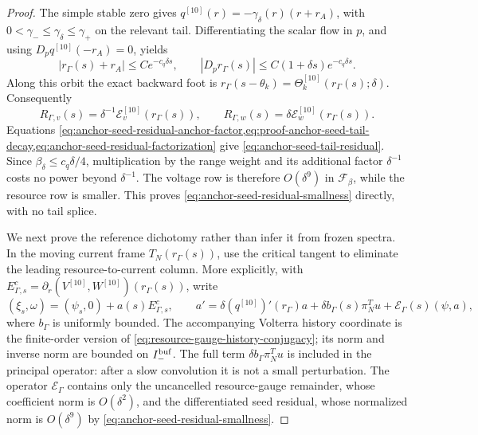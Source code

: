 \begin{proof}
The simple stable zero gives
\(q^{[10]}(r)=-\gamma_\delta(r)(r+r_A)\), with
\(0<\gamma_-\le\gamma_\delta\le\gamma_+\) on the relevant tail.
Differentiating the scalar flow in \(p\), and using
\(D_pq^{[10]}(-r_A)=0\), yields
\begin{equation}
 |r_\Gamma(s)+r_A|\le Ce^{-c_q\delta s},
 \qquad
 |D_pr_\Gamma(s)|\le C(1+\delta s)e^{-c_q\delta s}.
                                                               \label{eq:proof-anchor-seed-tail-decay}
\end{equation}
Along this orbit the exact backward foot is
\(r_\Gamma(s-\theta_k)=
\Theta_k^{[10]}(r_\Gamma(s);\delta)\).  Consequently
\begin{equation}
 R_{\Gamma,v}(s)=\delta^{-1}
     \mathcal E_v^{[10]}(r_\Gamma(s)),
 \qquad
 R_{\Gamma,w}(s)=\delta
     \mathcal E_w^{[10]}(r_\Gamma(s)).               \label{eq:anchor-seed-residual-factorization}
\end{equation}
Equations
\cref{eq:anchor-seed-residual-anchor-factor,eq:proof-anchor-seed-tail-decay,eq:anchor-seed-residual-factorization}
give \cref{eq:anchor-seed-tail-residual}.  Since
\(\beta_\delta\le c_q\delta/4\), multiplication by the range weight and
its additional factor \(\delta^{-1}\) costs no power beyond
\(\delta^{-1}\).  The voltage row is therefore \(O(\delta^9)\) in
\(\mathscr F_\beta\), while the resource row is smaller.  This proves
\cref{eq:anchor-seed-residual-smallness} directly, with no tail splice.

We next prove the reference dichotomy rather than infer it from frozen
spectra.  In the moving current frame \(T_N(r_\Gamma(s))\), use the
critical tangent to eliminate the leading resource-to-current column.
More explicitly, with
\(E_{\Gamma,s}^c=\partial_r(V^{[10]},W^{[10]})(r_\Gamma(s))\), write
\begin{equation}
 (\xi_s,\omega)=(\psi_s,0)+a(s)E_{\Gamma,s}^c,\qquad
 a'=\delta(q^{[10]})'(r_\Gamma)a
       +\delta b_\Gamma(s)\pi_N^Tu+\mathcal E_\Gamma(s)(\psi,a),
                                                               \label{eq:anchor-reference-resource-phase-row}
\end{equation}
where \(b_\Gamma\) is uniformly bounded.  The accompanying Volterra
history coordinate is the finite-order version of
\cref{eq:resource-gauge-history-conjugacy}; its norm and inverse norm are
bounded on \(I_-^{\rm buf}\).  The full term
\(\delta b_\Gamma\pi_N^Tu\) is included in the principal operator: after a
slow convolution it is not a small perturbation.  The operator
\(\mathcal E_\Gamma\) contains only the uncancelled resource-gauge
remainder, whose coefficient norm is \(O(\delta^2)\), and the differentiated
seed residual, whose normalized norm is \(O(\delta^9)\) by
\cref{eq:anchor-seed-residual-smallness}.


\end{proof}
